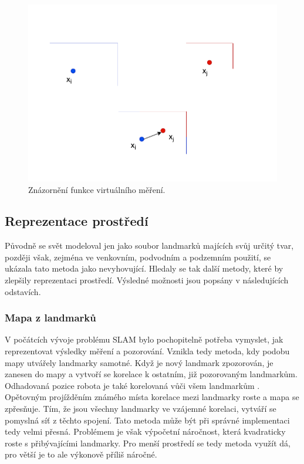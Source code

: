 \documentclass[12pt]{report}
\begin{document}
\begin{figure}[!ht]
	\begin{center}
		\includegraphics[width=0.6\columnwidth]{imgs/GBS_virtual_measurment.pdf}
	\end{center}
	\caption{Znázornění funkce virtuálního měření.}
	\label{fig:GBS_virtual_measurment}
\end{figure}

\newpage
\subsection{Reprezentace prostředí}
Původně se svět modeloval jen jako soubor landmarků majících svůj určitý tvar, později však, zejména ve venkovním, podvodním a podzemním použití, se ukázala tato metoda jako nevyhovující. Hledaly se tak další metody, které by zlepšily reprezentaci prostředí. Výsledné možnosti jsou popsány v následujících odstavích.

\subsubsection{Mapa z landmarků}
V počátcích vývoje problému SLAM bylo pochopitelně potřeba vymyslet, jak reprezentovat výsledky měření a pozorování. Vznikla tedy metoda, kdy podobu mapy utvářely landmarky samotné. Když je nový landmark zpozorován, je zanesen do mapy a vytvoří se korelace k ostatním, již pozorovaným landmarkům. Odhadovaná pozice robota je také korelovaná vůči všem landmarkům \cite{Durrant-Whyte2006}. \\
\indent Opětovným projížděním známého místa korelace mezi landmarky roste a mapa se zpřesňuje. Tím, že jsou všechny landmarky ve vzájemné korelaci, vytváří se pomyslná síť z těchto spojení. Tato metoda může být při správné implementaci tedy velmi přesná. Problémem je však výpočetní náročnost, která kvadraticky roste s přibývajícími landmarky. Pro menší prostředí se tedy metoda využít dá, pro větší je to ale výkonově příliš náročné.
\end{document}

